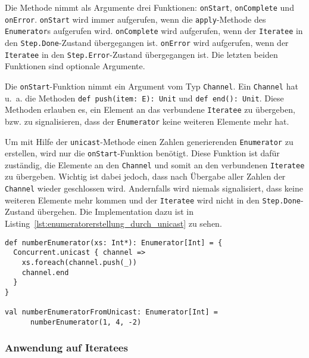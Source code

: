 Die Methode nimmt als Argumente drei Funktionen: \lstinline|onStart|, \lstinline|onComplete| und \lstinline|onError|.
\lstinline|onStart| wird immer aufgerufen, wenn die \lstinline|apply|-Methode des \lstinline|Enumerator|s aufgerufen wird.
\lstinline|onComplete| wird aufgerufen, wenn der \lstinline|Iteratee| in den \lstinline|Step.Done|-Zustand übergegangen ist.
\lstinline|onError| wird aufgerufen, wenn der \lstinline|Iteratee| in den \lstinline|Step.Error|-Zustand übergegangen ist.
Die letzten beiden Funktionen sind optionale Argumente.

Die \lstinline|onStart|-Funktion nimmt ein Argument vom Typ \lstinline|Channel|.
Ein \lstinline|Channel| hat u.~a. die Methoden \lstinline[breaklines=true]|def push(item: E): Unit| und \lstinline[breaklines=true]|def end(): Unit|.
Diese Methoden erlauben es, ein Element an das verbundene \lstinline|Iteratee| zu übergeben, bzw. zu signalisieren, dass der \lstinline|Enumerator| keine weiteren Elemente mehr hat.

Um mit Hilfe der \lstinline|unicast|-Methode einen Zahlen generierenden \lstinline|Enumerator| zu erstellen, wird nur die \lstinline|onStart|-Funktion benötigt.
Diese Funktion ist dafür zuständig, die Elemente an den \lstinline|Channel| und somit an den verbundenen \lstinline|Iteratee| zu übergeben.
Wichtig ist dabei jedoch, dass nach Übergabe aller Zahlen der \lstinline|Channel| wieder geschlossen wird.
Andernfalls wird niemals signalisiert, dass keine weiteren Elemente mehr kommen und der \lstinline|Iteratee| wird nicht in den \lstinline|Step.Done|-Zustand übergehen.
Die Implementation dazu ist in Listing~\ref{lst:enumeratorerstellung_durch_unicast} zu sehen.

\begin{lstlisting}[caption=Erstellung eines Enumerators durch die unicast-Konstruktormethode, label=lst:enumeratorerstellung_durch_unicast]
def numberEnumerator(xs: Int*): Enumerator[Int] = {
  Concurrent.unicast { channel =>
    xs.foreach(channel.push(_))
    channel.end
  }
}

val numberEnumeratorFromUnicast: Enumerator[Int] =
      numberEnumerator(1, 4, -2)
\end{lstlisting}



\subsubsection{Anwendung auf Iteratees} %
\label{ssub:anwendung_auf_iteratees}

